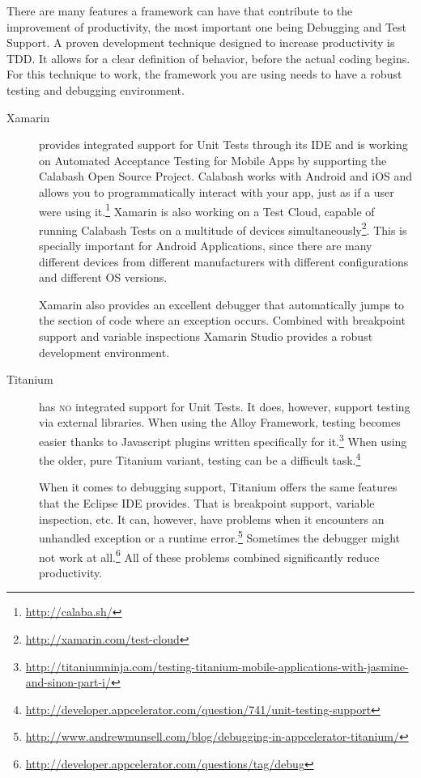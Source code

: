 There are many features a framework can have that contribute to the improvement of productivity, the most important one being Debugging and Test Support. A proven development technique designed to increase productivity is \ac{TDD}. It allows for a clear definition of behavior, before the actual coding begins. For this technique to work, the framework you are using needs to have a robust testing and debugging environment.

\begin{description}
\item[Xamarin] provides integrated support for Unit Tests through its \ac{IDE} and is working on Automated Acceptance Testing for Mobile Apps by supporting the Calabash Open Source Project. Calabash works with Android and iOS and allows you to programmatically interact with your app, just as if a user were using it.\footnote{\url{http://calaba.sh/}} Xamarin is also working on a Test Cloud, capable of running Calabash Tests on a multitude of devices simultaneously\footnote{\url{http://xamarin.com/test-cloud}}. This is specially important for Android Applications, since there are many different devices from different manufacturers with different configurations and different \ac{OS} versions.

Xamarin also provides an excellent debugger that automatically jumps to the section of code where an exception occurs. Combined with breakpoint support and variable inspections Xamarin Studio provides a robust development environment.

\item[Titanium] has \textsc{no} integrated support for Unit Tests. It does, however, support testing via external libraries. When using the Alloy Framework, testing becomes easier thanks to Javascript plugins written specifically for it.\footnote{\url{http://titaniumninja.com/testing-titanium-mobile-applications-with-jasmine-and-sinon-part-i/}} When using the older, pure Titanium variant, testing can be a difficult task.\footnote{\url{http://developer.appcelerator.com/question/741/unit-testing-support}}

When it comes to debugging support, Titanium offers the same features that the Eclipse \ac{IDE} provides. That is breakpoint support, variable inspection, etc. It can, however, have problems when it encounters an unhandled exception or a runtime error.\footnote{\url{http://www.andrewmunsell.com/blog/debugging-in-appcelerator-titanium/}} Sometimes the debugger might not work at all.\footnote{\url{http://developer.appcelerator.com/questions/tag/debug}} All of these problems combined significantly reduce productivity.    
\end{description}

